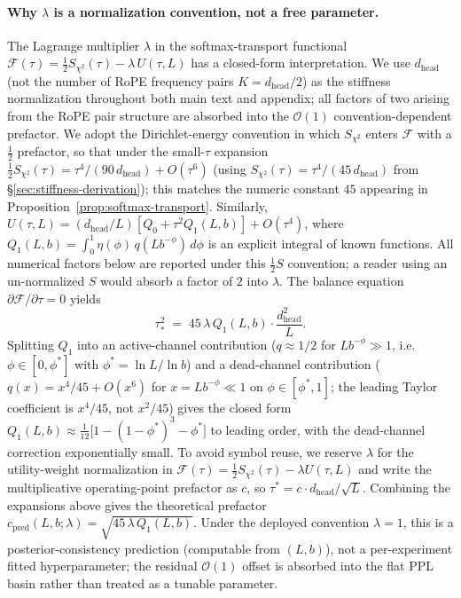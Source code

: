\paragraph{Why $\lambda$ is a normalization convention, not a free parameter.} The Lagrange multiplier $\lambda$ in the softmax-transport functional $\mathcal{F}(\tau) = \tfrac{1}{2}S_{\chi^2}(\tau) - \lambda\,U(\tau,L)$ has a closed-form interpretation. We use $d_{\mathrm{head}}$ (not the number of RoPE frequency pairs $K = d_{\mathrm{head}}/2$) as the stiffness normalization throughout both main text and appendix; all factors of two arising from the RoPE pair structure are absorbed into the $\mathcal{O}(1)$ convention-dependent prefactor. We adopt the Dirichlet-energy convention in which $S_{\chi^2}$ enters $\mathcal{F}$ with a $\tfrac{1}{2}$ prefactor, so that under the small-$\tau$ expansion $\tfrac{1}{2}S_{\chi^2}(\tau) = \tau^4/(90\,d_{\mathrm{head}}) + O(\tau^6)$ (using $S_{\chi^2}(\tau) = \tau^4/(45\,d_{\mathrm{head}})$ from \S\ref{sec:stiffness-derivation}); this matches the numeric constant $45$ appearing in Proposition~\ref{prop:softmax-transport}. Similarly, $U(\tau,L) = (d_{\mathrm{head}}/L)[Q_0 + \tau^2 Q_1(L,b)] + O(\tau^4)$, where $Q_1(L,b) = \int_0^1 \eta(\phi)\,q(Lb^{-\phi})\,d\phi$ is an explicit integral of known functions. All numerical factors below are reported under this $\tfrac{1}{2}S$ convention; a reader using an un-normalized $S$ would absorb a factor of $2$ into $\lambda$. The balance equation $\partial\mathcal{F}/\partial\tau = 0$ yields
\[
\tau_*^2 \;=\; 45\,\lambda\,Q_1(L,b)\cdot\frac{d_{\mathrm{head}}^2}{L}.
\]
Splitting $Q_1$ into an active-channel contribution ($q \approx 1/2$ for $Lb^{-\phi} \gg 1$, i.e.\ $\phi \in [0, \phi^*]$ with $\phi^* = \ln L/\ln b$) and a dead-channel contribution ($q(x) = x^4/45 + O(x^6)$ for $x = Lb^{-\phi} \ll 1$ on $\phi \in [\phi^*, 1]$; the leading Taylor coefficient is $x^4/45$, not $x^2/45$) gives the closed form $Q_1(L,b) \approx \tfrac{1}{12}\bigl[1 - (1-\phi^*)^3 - \phi^*\bigr]$ to leading order, with the dead-channel correction exponentially small. To avoid symbol reuse, we reserve $\lambda$ for the utility-weight normalization in $\mathcal{F}(\tau){=}\tfrac{1}{2}S_{\chi^2}(\tau){-}\lambda U(\tau,L)$ and write the multiplicative operating-point prefactor as $c$, so $\tau^{*} = c\cdot d_{\mathrm{head}}/\sqrt{L}$. Combining the expansions above gives the theoretical prefactor $c_{\mathrm{pred}}(L,b;\lambda) = \sqrt{45\,\lambda\,Q_1(L,b)}$. Under the deployed convention $\lambda{=}1$, this is a posterior-consistency prediction (computable from $(L,b)$), not a per-experiment fitted hyperparameter; the residual $\mathcal{O}(1)$ offset is absorbed into the flat PPL basin rather than treated as a tunable parameter.

